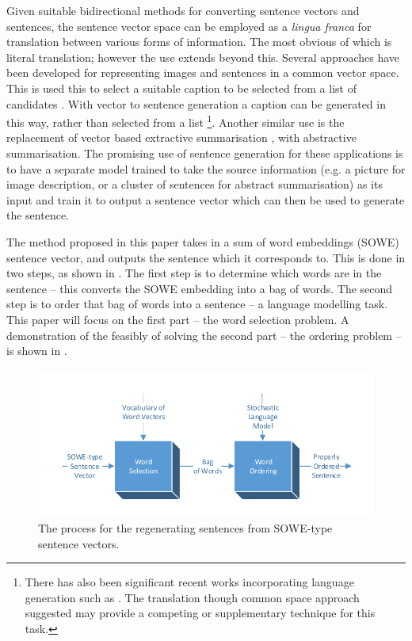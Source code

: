 \documentclass[11pt]{article}
\theoremstyle{plain}
\theoremstyle{definition}
\begin{document}
Given suitable bidirectional methods for converting sentence vectors and sentences, the sentence vector space can be employed as a \emph{lingua franca} for translation between various forms of information. The most obvious of which is literal translation; however the use extends beyond this. Several approaches have been developed for representing images and sentences in a common vector space. This is used this to select a suitable caption to be selected from a list of candidates \parencite{farhadi2010every,socherDTRNN}. With vector to sentence generation a caption can be generated in this way, rather than selected from a list \footnote{There has also been significant recent works incorporating language generation such as \textcite{donahue2014long,Mao2014GenerateImageDesc}. The translation though common space approach suggested may provide a competing or supplementary technique for this task.}. Another similar use is the replacement of vector based extractive summarisation \textcite{KaagebExtractiveSummaristation,yogatamaextractive}, with abstractive summarisation. The promising use of sentence generation for these applications is to have a separate model trained to take the source information (e.g. a picture for image description, or a cluster of sentences for abstract summarisation) as its input and train it to output a sentence vector which can then be used to generate the sentence.


The method proposed in this paper takes in a sum of word embeddings (SOWE) sentence vector, and outputs the sentence which it corresponds to. This is done in two steps, as shown in . The first step is to determine which words are in the sentence -- this converts the SOWE embedding into a bag of words. The second step is to order that bag of words into a sentence -- a language modelling task. This paper will focus on the first part -- the word selection problem. A demonstration of the feasibly of solving the second part -- the ordering problem --  is shown in .

\begin{figure}
	\centering 
	\includegraphics[width=\columnwidth]{block_diagram}
	\caption{The process for the regenerating sentences from SOWE-type sentence vectors. }
	\label{block_diagram}
\end{figure}
\end{document}
